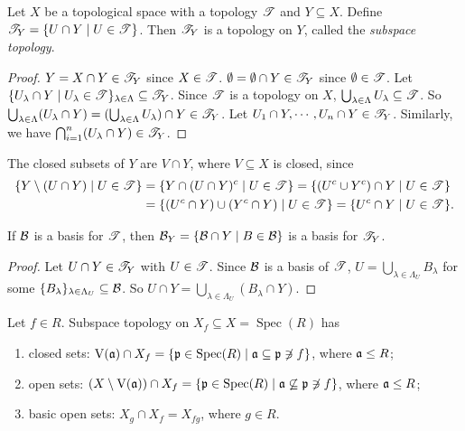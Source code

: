 \begin{proposition}
    Let $X$ be a topological space with a topology $\mathscr{T}$ and $Y \subseteq X$. Define $\mathscr{T}_Y = \{U \cap Y \mid U \in \mathscr{T}\}$. Then $\mathscr{T}_Y$ is a topology on $Y$, called the \emph{subspace topology}.
\end{proposition}

\begin{proof}
    $Y = X \cap Y \in \mathscr{T}_Y$ since $X \in \mathscr{T}$. $\emptyset = \emptyset \cap Y  \in \mathscr{T}_Y$ since $\emptyset \in \mathscr{T}$. Let $\{U_\lambda \cap Y \mid U_\lambda \in \mathscr{T}\}_{\lambda \in \Lambda} \subseteq \mathscr{T}_Y$. Since $\mathscr{T}$ is a topology on $X$, $\bigcup_{\lambda \in \Lambda} U_\lambda \subseteq \mathscr{T}$. So $\bigcup_{\lambda \in \Lambda} (U_\lambda \cap Y) = (\bigcup_{\lambda \in \Lambda}U_\lambda) \cap Y \in \mathscr{T}_Y$. Let $U_1 \cap Y,\cdots,U_n \cap Y \in \mathscr{T}_Y$. Similarly, we have $\bigcap_{i=1}^n (U_\lambda \cap Y) \in \mathscr{T}_Y$. 
\end{proof}

\begin{remark}
    The closed subsets of $Y$ are $V \cap Y$, where $V \subseteq X$ is closed, since 
    \begin{align*}
        \{Y \setminus (U \cap Y) \mid U \in \mathscr{T}\} &= \{Y \cap (U \cap Y)^c \mid U \in \mathscr{T}\} = \{(U^c \cup Y^c) \cap Y \mid U \in \mathscr{T}\} \\
                                                   &= \{(U^c \cap Y) \cup (Y^c \cap Y) \mid U \in \mathscr{T}\} = \{U^c \cap Y \mid U \in \mathscr{T}\}.
    \end{align*}
\end{remark}

\begin{proposition}
    If $\mathcal{B}$ is a basis for $\mathscr{T}$, then $\mathcal{B}_Y = \{\mathcal{B} \cap Y \mid B \in \mathcal{B}\}$ is a basis for $\mathscr{T}_Y$.
\end{proposition}

\begin{proof}
    Let $U \cap Y \in \mathscr{T}_Y$ with $U \in \mathscr{T}$. Since $\mathcal{B}$ is a basis of $\mathscr{T}$, $U = \bigcup_{\lambda \in \Lambda_U} B_\lambda$ for some $\{B_\lambda\}_{\lambda \in \Lambda_U} \subseteq \mathcal{B}$. So $U \cap Y = \bigcup_{\lambda \in \Lambda_U} (B_\lambda \cap Y)$. 
\end{proof}

\begin{corollary}
    Let $f \in R$. Subspace topology on $X_f \subseteq X = \operatorname{Spec}(R)$ has 
    \begin{enumerate}
        \item closed sets: $\operatorname{V}(\mathfrak{a}) \cap X_f = \{\mathfrak{p} \in \operatorname{Spec}(R) \mid \mathfrak{a} \subseteq \mathfrak{p} \not \ni f\}$, where $\mathfrak{a} \leq R$;
        \item open sets: $(X \setminus \operatorname{V}(\mathfrak{a})) \cap X_f = \{\mathfrak{p} \in \operatorname{Spec}(R) \mid \mathfrak{a} \not \subseteq \mathfrak{p} \not \ni f\}$, where $\mathfrak{a} \leq R$;
        \item basic open sets: $X_g \cap X_f = X_{fg}$, where $g \in R$.
    \end{enumerate}
\end{corollary}

